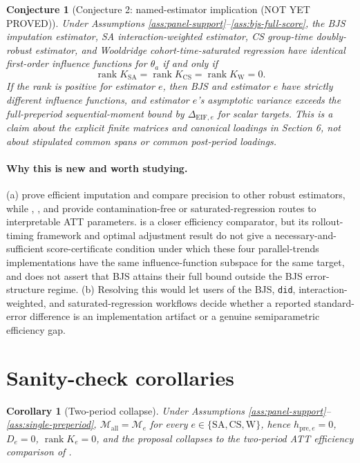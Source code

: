 \documentclass[11pt]{article}
\theoremstyle{definition}
\theoremstyle{plain}
\newtheorem{conjecture}{Conjecture}
\newtheorem{corollary}{Corollary}
\theoremstyle{remark}
\begin{document}
\begin{conjecture}[Conjecture 2: named-estimator implication (NOT YET PROVED)]\label{conj:named-estimator-implication}
Under Assumptions \ref{ass:panel-support}--\ref{ass:bjs-full-score}, the BJS
imputation estimator, SA interaction-weighted estimator, CS group-time
doubly-robust estimator, and Wooldridge cohort-time-saturated regression have
identical first-order influence functions for \(\theta_a\) if and only if
\[
  \operatorname{rank}K_{\mathrm{SA}}
  =\operatorname{rank}K_{\mathrm{CS}}
  =\operatorname{rank}K_{\mathrm{W}}=0.
\]
If the rank is positive for estimator \(e\), then BJS and estimator \(e\) have
strictly different influence functions, and estimator \(e\)'s asymptotic
variance exceeds the full-preperiod sequential-moment bound by
\(\Delta_{\mathrm{EIF},e}\) for scalar targets.  This is a claim about the
explicit finite matrices and canonical loadings in Section 6, not about
stipulated common spans or common post-period loadings.
\end{conjecture}

\paragraph{Why this is new and worth studying.}
(a) \citet{BorusyakJaravelSpiess2024} prove efficient imputation and compare
precision to other robust estimators, while \citet{SunAbraham2021},
\citet{CallawaySantAnna2021}, and \citet{Wooldridge2021} provide
contamination-free or saturated-regression routes to interpretable ATT
parameters.  \citet{RothSantAnna2023Efficient} is a closer efficiency
comparator, but its rollout-timing framework and optimal adjustment result do
not give a necessary-and-sufficient score-certificate condition under which
these four parallel-trends implementations have the same influence-function
subspace for the same target, and \citet{ChenSantAnnaXie2025} does not assert
that BJS
attains their full bound outside the BJS error-structure regime.  (b)
Resolving this would let users of the BJS,
\texttt{did}, interaction-weighted, and saturated-regression workflows decide
whether a reported standard-error difference is an implementation artifact or
a genuine semiparametric efficiency gap.

\section{Sanity-check corollaries}
\begin{corollary}[Two-period collapse]\label{cor:two-period-collapse}
Under Assumptions \ref{ass:panel-support}--\ref{ass:single-preperiod},
\(\mathcal M_{\mathrm{all}}=\mathcal M_e\) for every
\(e\in\{\mathrm{SA},\mathrm{CS},\mathrm{W}\}\), hence
\(h_{\mathrm{pre},e}=0\), \(D_e=0\), \(\operatorname{rank}K_e=0\), and
the proposal collapses to the two-period ATT efficiency comparison of
\citet{SantAnnaZhao2020}.
\end{corollary}
\end{document}
